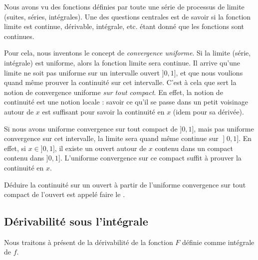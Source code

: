 Nous avons vu des fonctions définies par toute une série de processus de limite (suites, séries, intégrales). Une des questions centrales est de savoir si la fonction limite est continue, dérivable, intégrale, etc. étant donné que les fonctions sont continues.

Pour cela, nous inventons le concept de \emph{convergence uniforme}. Si la limite (série, intégrale) est uniforme, alors la fonction limite sera continue. Il arrive qu'une limite ne soit pas uniforme sur un intervalle ouvert $]0,1]$, et que nous voulions quand même prouver la continuité sur cet intervalle. C'est à cela que sert la notion de convergence uniforme \emph{sur tout compact}. En effet, la notion de continuité est une notion locale : savoir ce qu'il se passe dans un petit voisinage autour de $x$ est suffisant pour savoir la continuité en $x$ (idem pour sa dérivée).

Si nous avons uniforme convergence sur tout compact de $]0,1]$, mais pas uniforme convergence sur cet intervalle, la limite sera quand même continue sur $\mathopen] 0 , 1 \mathclose]$. En effet, si $x\in]0,1]$, il existe un ouvert autour de $x$ contenu dans un compact contenu dans $]0,1]$. L'uniforme convergence sur ce compact suffit à prouver la continuité en $x$.

Déduire la continuité sur un ouvert à partir de l'uniforme convergence sur tout compact de l'ouvert est appelé faire le .


\subsection{Dérivabilité sous l'intégrale}

Nous traitons à présent de la dérivabilité de la fonction \( F\) définie comme intégrale de \( f\).

